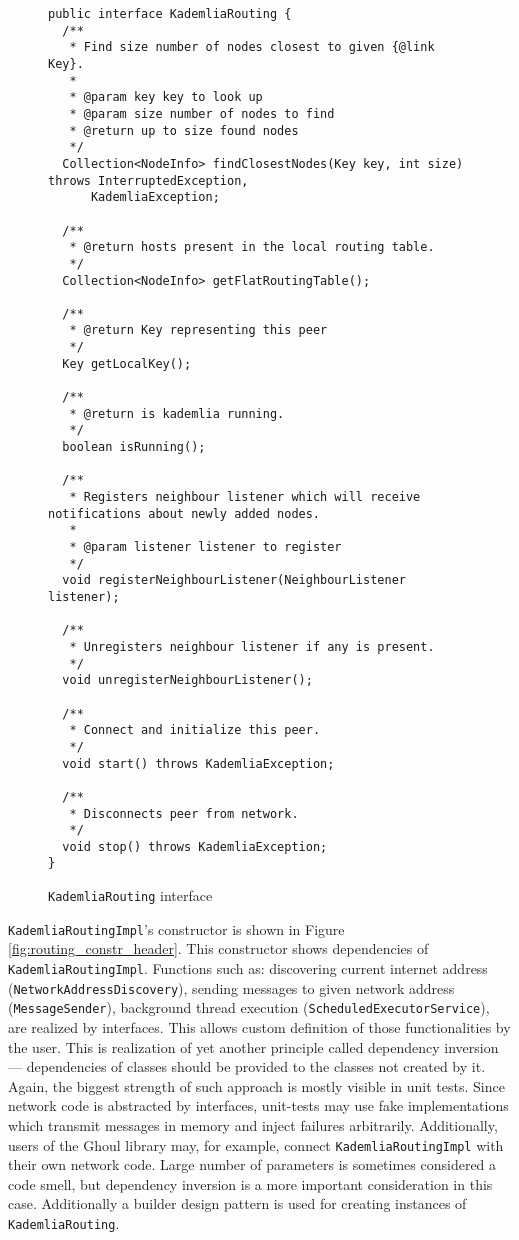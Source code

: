 \begin{figure}[tbp]
\begin{lstlisting}
public interface KademliaRouting {
  /**
   * Find size number of nodes closest to given {@link Key}.
   *
   * @param key key to look up
   * @param size number of nodes to find
   * @return up to size found nodes
   */
  Collection<NodeInfo> findClosestNodes(Key key, int size) throws InterruptedException,
      KademliaException;

  /**
   * @return hosts present in the local routing table.
   */
  Collection<NodeInfo> getFlatRoutingTable();

  /**
   * @return Key representing this peer
   */
  Key getLocalKey();

  /**
   * @return is kademlia running.
   */
  boolean isRunning();

  /**
   * Registers neighbour listener which will receive notifications about newly added nodes.
   *
   * @param listener listener to register
   */
  void registerNeighbourListener(NeighbourListener listener);

  /**
   * Unregisters neighbour listener if any is present.
   */
  void unregisterNeighbourListener();

  /**
   * Connect and initialize this peer.
   */
  void start() throws KademliaException;

  /**
   * Disconnects peer from network.
   */
  void stop() throws KademliaException;
}
\end{lstlisting}
\caption{\texttt{KademliaRouting} interface}
\label{fig:routing_interface}
\end{figure}

{\texttt{KademliaRoutingImpl}'s constructor} is shown in Figure
\ref{fig:routing_constr_header}.
This constructor shows dependencies of \texttt{KademliaRoutingImpl}.
Functions such as: discovering current internet address
(\texttt{NetworkAddressDiscovery}), sending messages to given network address
(\texttt{MessageSender}), background thread execution
(\texttt{ScheduledExecutorService}), are realized by interfaces.
This allows custom definition of those functionalities by the user.
This is realization of yet another principle called dependency inversion ---
dependencies of classes should be provided to the classes not created by it.
Again, the biggest strength of such approach is mostly visible in unit tests.
Since network code is abstracted by interfaces, unit-tests may use fake
implementations which transmit messages in memory and inject failures
arbitrarily.
Additionally, users of the Ghoul library may, for example, connect
\texttt{KademliaRoutingImpl} with their own network code.
Large number of parameters is sometimes considered a code smell, but dependency
inversion is a more important consideration in this case.
Additionally a builder design pattern is used for creating instances of
\texttt{KademliaRouting}.

